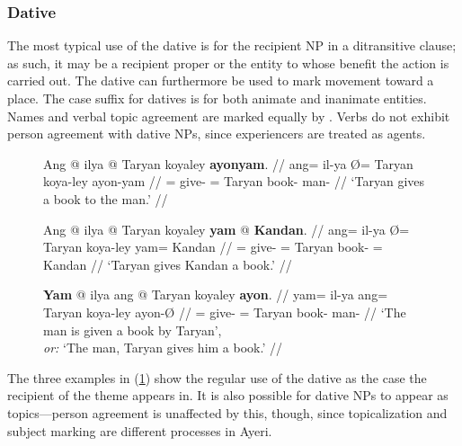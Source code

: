 \subsubsection{Dative}
\label{subsubsec:dative}

The most typical use of the dative is for the recipient NP in a ditransitive
clause; as such, it may be a recipient proper or the entity to whose benefit
the action is carried out. The dative can furthermore be used to mark movement
toward a place. The case suffix for datives is  for both
animate and inanimate entities. Names and verbal topic agreement are marked
equally by . Verbs do not exhibit person agreement with dative
NPs, since experiencers are treated as agents.

\begin{figure}[h]
\pex\label{ex:datregular}
\a\begingl
	\gla Ang @ ilya {} @ Taryan koyaley \textbf{ayonyam}. //
	\glb ang= il-ya Ø= Taryan koya-ley ayon-yam //
	\glc \AgtT{}= give-\TsgM{} \Top{}= Taryan book-\PargI{} 
		man-\Dat{} //
	\glft `Taryan gives a book to the man.' //
\endgl

\a\begingl
	\gla Ang @ ilya {} @ Taryan koyaley \textbf{yam} @ \textbf{Kandan}. //
	\glb ang= il-ya Ø= Taryan koya-ley yam= Kandan //
	\glc \AgtT{}= give-\TsgM{} \Top{}= Taryan book-\PargI{} \Dat{}= Kandan //
	\glft `Taryan gives Kandan a book.' //
\endgl

\a\begingl
	\gla \textbf{Yam} @ ilya ang @ Taryan koyaley \textbf{ayon}. //
	\glb yam= il-ya ang= Taryan koya-ley ayon-Ø //
	\glc \DatT{}= give-\TsgM{} \Aarg{}= Taryan book-\PargI{} man-\Top{} //
	\glft `The man is given a book by Taryan',\\
		\textit{or:} `The man, Taryan gives him a book.' //
\endgl
\xe
\end{figure}

The three examples in (\ref{ex:datregular}) show the regular use of the dative
as the case the recipient of the theme appears in. It is also possible for
dative NPs to appear as topics---person agreement is unaffected by this,
though, since topicalization and subject marking are different processes in
Ayeri.

